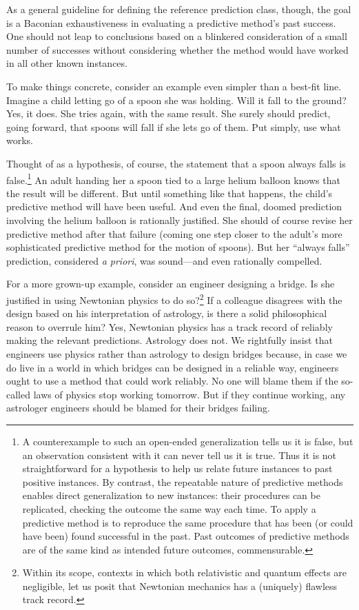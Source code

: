 \documentclass[
  letterpaper,
  DIV=11,
  numbers=noendperiod]{scrartcl}
\theoremstyle{definition}
\theoremstyle{remark}
\begin{document}
As a general guideline for defining the reference prediction class,
though, the goal is a Baconian exhaustiveness in evaluating a predictive
method's past success. One should not leap to conclusions based on a
blinkered consideration of a small number of successes without
considering whether the method would have worked in all other known
instances.

To make things concrete, consider an example even simpler than a
best-fit line. Imagine a child letting go of a spoon she was holding.
Will it fall to the ground? Yes, it does. She tries again, with the same
result. She surely should predict, going forward, that spoons will fall
if she lets go of them. Put simply, use what works.

Thought of as a hypothesis, of course, the statement that a spoon always
falls is false.\footnote{A counterexample to such an open-ended
  generalization tells us it is false, but an observation consistent
  with it can never tell us it is true. Thus it is not straightforward
  for a hypothesis to help us relate future instances to past positive
  instances. By contrast, the repeatable nature of predictive methods
  enables direct generalization to new instances: their procedures can
  be replicated, checking the outcome the same way each time. To apply a
  predictive method is to reproduce the same procedure that has been (or
  could have been) found successful in the past. Past outcomes of
  predictive methods are of the same kind as intended future outcomes,
  commensurable.} An adult handing her a spoon tied to a large helium
balloon knows that the result will be different. But until something
like that happens, the child's predictive method will have been useful.
And even the final, doomed prediction involving the helium balloon is
rationally justified. She should of course revise her predictive method
after that failure (coming one step closer to the adult's more
sophisticated predictive method for the motion of spoons). But her
``always falls'' prediction, considered \emph{a priori}, was sound---and
even rationally compelled.

For a more grown-up example, consider an engineer designing a bridge. Is
she justified in using Newtonian physics to do so?\footnote{Within its
  scope, contexts in which both relativistic and quantum effects are
  negligible, let us posit that Newtonian mechanics has a (uniquely)
  flawless track record.} If a colleague disagrees with the design based
on his interpretation of astrology, is there a solid philosophical
reason to overrule him? Yes, Newtonian physics has a track record of
reliably making the relevant predictions. Astrology does not. We
rightfully insist that engineers use physics rather than astrology to
design bridges because, in case we do live in a world in which bridges
can be designed in a reliable way, engineers ought to use a method that
could work reliably. No one will blame them if the so-called laws of
physics stop working tomorrow. But if they continue working, any
astrologer engineers should be blamed for their bridges failing.
\end{document}
